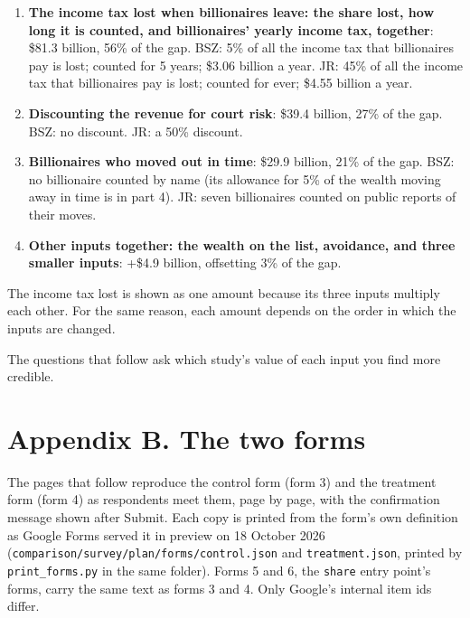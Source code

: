 \begin{enumerate}
\def\labelenumi{\arabic{enumi}.}
\tightlist
\item
  \textbf{The income tax lost when billionaires leave: the share lost, how long it is counted, and billionaires' yearly income tax, together}: \$81.3 billion, 56\% of the gap. BSZ: 5\% of all the income tax that billionaires pay is lost; counted for 5 years; \$3.06 billion a year. JR: 45\% of all the income tax that billionaires pay is lost; counted for ever; \$4.55 billion a year.
\item
  \textbf{Discounting the revenue for court risk}: \$39.4 billion, 27\% of the gap. BSZ: no discount. JR: a 50\% discount.
\item
  \textbf{Billionaires who moved out in time}: \$29.9 billion, 21\% of the gap. BSZ: no billionaire counted by name (its allowance for 5\% of the wealth moving away in time is in part 4). JR: seven billionaires counted on public reports of their moves.
\item
  \textbf{Other inputs together: the wealth on the list, avoidance, and three smaller inputs}: +\$4.9 billion, offsetting 3\% of the gap.
\end{enumerate}

The income tax lost is shown as one amount because its three inputs multiply each other. For the same reason, each amount depends on the order in which the inputs are changed.

The questions that follow ask which study's value of each input you find more credible.

\section{Appendix B. The two forms}\label{appendix-b.-the-two-forms}

The pages that follow reproduce the control form (form 3) and the treatment form (form 4) as
respondents meet them, page by page, with the confirmation message shown after Submit. Each copy
is printed from the form's own definition as Google Forms served it in preview on 18 October 2026
(\texttt{comparison/survey/plan/forms/control.json} and \texttt{treatment.json}, printed by \texttt{print\_forms.py} in
the same folder). Forms 5 and 6, the \texttt{share} entry point's forms, carry the same text as forms 3
and 4. Only Google's internal item ids differ.
